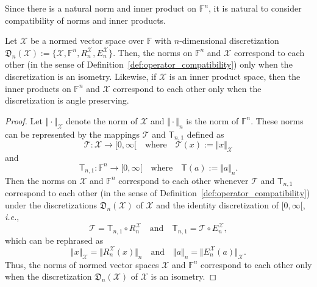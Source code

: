 \documentclass[a4paper]{paper}
\newcommand{\Discr}{\mathfrak{D}}
\newcommand{\VecSpace}[1]{\mathscr{#1}}
\newcommand{\Field}{\mathbb{F}}
\newcommand{\Op}[1]{\mathcal{#1}}
\newcommand{\DiscOp}[1]{\mathsf{#1}}
\newcommand*{\EXT}[2]{\ensuremath{E_{#1}^{#2}}}
\newcommand*{\REST}[2]{\ensuremath{R_{#1}^{#2}}}
\newcommand*{\RnX}{\ensuremath{\REST{n}{\VecSpace{X}}}}
\newcommand*{\EnX}{\ensuremath{\EXT{n}{\VecSpace{X}}}}
\newcommand{\ie}{\textsl{i.e.}\xspace}
\begin{document}
Since there is a 
natural norm and inner product on
$\Field^{n}$, it is natural to consider compatibility of norms and inner products. 
\begin{theorem}\label{ThmNormInnerProd}
  Let $\VecSpace{X}$ be a normed vector space over $\Field$ with $n$-dimensional
  discretization $\Discr_{n}(\VecSpace{X}):=\{\VecSpace{X},\Field^{n},\RnX,\EnX\}$. 
  Then, the norms on $\Field^{n}$ and $\VecSpace{X}$ correspond to each other 
  (in the sense of Definition~\ref{def:operator_compatibility}) only when the discretization is an isometry. 
  Likewise, if $\VecSpace{X}$ is an inner product space, then the 
  inner products on $\Field^{n}$ and $\VecSpace{X}$  
  correspond to each other only when the discretization is angle preserving.
\end{theorem}
\begin{proof}
Let $\Vert \cdot \Vert_{\VecSpace{X}}$ denote the norm of $\VecSpace{X}$ and $\Vert \cdot \Vert_{n}$ is the 
norm of $\Field^{n}$. These norms can be represented by the mappings $\Op{T}$ and $\DiscOp{T}_{n,1}$ 
defined as  
\[ \Op{T} \colon \VecSpace{X}  \to [0,\infty[  \quad\text{where}\quad \Op{T}(x):=\Vert x \Vert_{\VecSpace{X}} \] 
and 
\[ \DiscOp{T}_{n,1} \colon \Field^{n} \to [0,\infty[  \quad\text{where}\quad \DiscOp{T}(a):=\Vert a \Vert_{n}. \] 
Then the norms on $\VecSpace{X}$ and $\Field^{n}$ 
correspond to each other whenever $\Op{T}$ and $\DiscOp{T}_{n,1}$ correspond to each other 
(in the sense of Definition~\ref{def:operator_compatibility}) 
under the discretizations $\Discr_{n}(\VecSpace{X})$ of $\VecSpace{X}$ 
and the identity discretization of  $[0,\infty[$, \ie,
\[  \Op{T} =  \DiscOp{T}_{n,1} \circ \RnX
   \quad\text{and}\quad 
   \DiscOp{T}_{n,1} =  \Op{T} \circ \EnX,
\]
which can be rephrased as
\[ \Vert x \Vert_{\VecSpace{X}} = \bigl\Vert \RnX(x) \bigr\Vert_{n}
    \quad \text{and}\quad
   \Vert a \Vert_{n} = \bigl\Vert \EnX(a) \bigr\Vert_{\VecSpace{X}}.
\]
Thus, the norms of normed vector spaces $\VecSpace{X}$ and $\Field^{n}$ correspond
to each other only when the discretization $\Discr_{n}(\VecSpace{X})$ of $\VecSpace{X}$ is an isometry. 


\end{proof}
\end{document}
